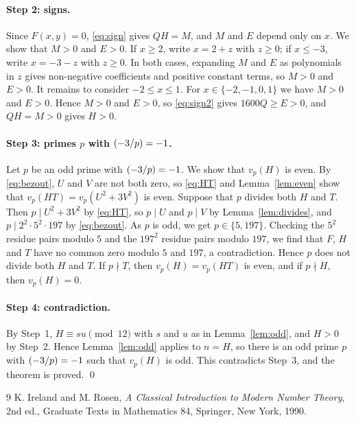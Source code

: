 \documentclass[11pt]{article}
\newcommand{\leg}[2]{\mathchoice{\biggl(\dfrac{#1}{#2}\biggr)}{(#1/#2)}{(#1/#2)}{(#1/#2)}}
\begin{document}
\paragraph{Step 2: signs.} Since $F(x,y)=0$, \eqref{eq:sign} gives $QH=M$, and $M$ and $E$ depend only on $x$. We show that $M>0$ and $E>0$. If $x\geq2$, write $x=2+z$ with $z\geq0$; if $x\leq-3$, write $x=-3-z$ with $z\geq0$. In both cases, expanding $M$ and $E$ as polynomials in $z$ gives non-negative coefficients and positive constant terms, so $M>0$ and $E>0$. It remains to consider $-2\leq x\leq1$. For $x\in\{-2,-1,0,1\}$ we have $M>0$ and $E>0$. Hence $M>0$ and $E>0$, so \eqref{eq:sign2} gives $1600Q\geq E>0$, and $QH=M>0$ gives $H>0$.

\paragraph{\texorpdfstring{Step 3: primes $p$ with $\leg{-3}{p}=-1$.}{Step 3: inert primes.}} Let $p$ be an odd prime with $\leg{-3}{p}=-1$. We show that $v_p(H)$ is even. By \eqref{eq:bezout}, $U$ and $V$ are not both zero, so \eqref{eq:HT} and Lemma~\ref{lem:even} show that $v_p(HT)=v_p(U^2+3V^2)$ is even. Suppose that $p$ divides both $H$ and $T$. Then $p\mid U^2+3V^2$ by \eqref{eq:HT}, so $p\mid U$ and $p\mid V$ by Lemma~\ref{lem:divides}, and $p\mid 2^{2}\cdot 5^{2}\cdot 197$ by \eqref{eq:bezout}. As $p$ is odd, we get $p\in\{5,197\}$. Checking the $5^2$ residue pairs modulo $5$ and the $197^2$ residue pairs modulo $197$, we find that $F$, $H$ and $T$ have no common zero modulo $5$ and $197$, a contradiction. Hence $p$ does not divide both $H$ and $T$. If $p\nmid T$, then $v_p(H)=v_p(HT)$ is even, and if $p\nmid H$, then $v_p(H)=0$.

\paragraph{Step 4: contradiction.} By Step~1, $H\equiv su\pmod{12}$ with $s$ and $u$ as in Lemma~\ref{lem:odd}, and $H>0$ by Step~2. Hence Lemma~\ref{lem:odd} applies to $n=H$, so there is an odd prime $p$ with $\leg{-3}{p}=-1$ such that $v_p(H)$ is odd. This contradicts Step~3, and the theorem is proved.
\qed

\begin{thebibliography}{9}
 K. Ireland and M. Rosen, \emph{A Classical Introduction to Modern Number Theory}, 2nd ed., Graduate Texts in Mathematics 84, Springer, New York, 1990.
\end{thebibliography}
\end{document}
